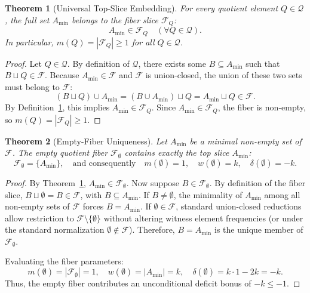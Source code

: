 \documentclass[11pt,a4paper]{article}
\theoremstyle{plain}
\newtheorem{theorem}{Theorem}[section]
\theoremstyle{definition}
\theoremstyle{remark}
\newcommand{\F}{\mathcal{F}}
\newcommand{\Q}{\mathcal{Q}}
\begin{document}
\begin{theorem}[Universal Top-Slice Embedding]\label{thm:top_slice}
For every quotient element $Q \in \Q$, the full set $A_{\min}$ belongs to the fiber slice $\F_Q$:
\begin{equation}
A_{\min} \in \F_Q \quad (\forall Q \in \Q).
\end{equation}
In particular, $m(Q) = |\F_Q| \ge 1$ for all $Q \in \Q$.
\end{theorem}
\begin{proof}
Let $Q \in \Q$. By definition of $\Q$, there exists some $B \subseteq A_{\min}$ such that $B \sqcup Q \in \F$. Because $A_{\min} \in \F$ and $\F$ is union-closed, the union of these two sets must belong to $\F$:
\begin{equation}
(B \sqcup Q) \cup A_{\min} = (B \cup A_{\min}) \sqcup Q = A_{\min} \sqcup Q \in \F.
\end{equation}
By Definition~\ref{thm:top_slice}, this implies $A_{\min} \in \F_Q$. Since $A_{\min} \in \F_Q$, the fiber is non-empty, so $m(Q) = |\F_Q| \ge 1$.
\end{proof}

\begin{theorem}[Empty-Fiber Uniqueness]\label{thm:empty_fiber}
Let $A_{\min}$ be a minimal non-empty set of $\F$. The empty quotient fiber $\F_\emptyset$ contains exactly the top slice $A_{\min}$:
\begin{equation}
\F_\emptyset = \{A_{\min}\}, \quad \text{and consequently} \quad m(\emptyset) = 1, \quad w(\emptyset) = k, \quad \delta(\emptyset) = -k.
\end{equation}
\end{theorem}
\begin{proof}
By Theorem~\ref{thm:top_slice}, $A_{\min} \in \F_\emptyset$. Now suppose $B \in \F_\emptyset$. By definition of the fiber slice, $B \sqcup \emptyset = B \in \F$, with $B \subseteq A_{\min}$. If $B \ne \emptyset$, the minimality of $A_{\min}$ among all non-empty sets of $\F$ forces $B = A_{\min}$. If $\emptyset \in \F$, standard union-closed reductions allow restriction to $\F \setminus \{\emptyset\}$ without altering witness element frequencies (or under the standard normalization $\emptyset \notin \F$). Therefore, $B = A_{\min}$ is the unique member of $\F_\emptyset$.

Evaluating the fiber parameters:
\begin{equation}
m(\emptyset) = |\F_\emptyset| = 1, \quad w(\emptyset) = |A_{\min}| = k, \quad \delta(\emptyset) = k \cdot 1 - 2k = -k.
\end{equation}
Thus, the empty fiber contributes an unconditional deficit bonus of $-k \le -1$.
\end{proof}
\end{document}
